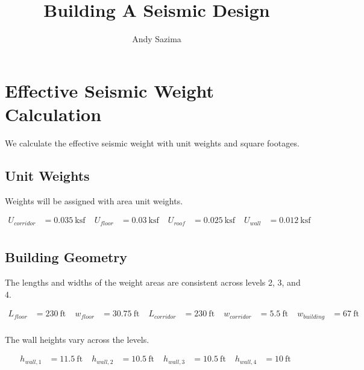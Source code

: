 \documentclass[11pt]{article}
\title{Building A Seismic Design}
\author{Andy Sazima}
\begin{document}
    
    \maketitle
    
    

    
    \section{Effective Seismic Weight
Calculation}\label{effective-seismic-weight-calculation}

    We calculate the effective seismic weight with unit weights and square
footages.

    \subsection{Unit Weights}\label{unit-weights}

    Weights will be assigned with area unit weights.

    \begin{equation*}
\begin{aligned}
U_{corridor} &= 0.035\ \mathrm{ksf} \; 
 &U_{floor} &= 0.03\ \mathrm{ksf} \; 
 &U_{roof} &= 0.025\ \mathrm{ksf} \; 
 &U_{wall} &= 0.012\ \mathrm{ksf} \; 
\\
\end{aligned}
\end{equation*}

    
    \subsection{Building Geometry}\label{building-geometry}

    The lengths and widths of the weight areas are consistent across levels
2, 3, and 4.

    \begin{equation*}
\begin{aligned}
L_{floor} &= 230\ \mathrm{ft} \; 
 &w_{floor} &= 30.75\ \mathrm{ft} \; 
 &L_{corridor} &= 230\ \mathrm{ft} \; 
 &w_{corridor} &= 5.5\ \mathrm{ft} \; 
 &w_{building} &= 67\ \mathrm{ft} \; 
\\
\end{aligned}
\end{equation*}

    
    The wall heights vary across the levels.

    \begin{equation*}
\begin{aligned}
h_{wall,1} &= 11.5\ \mathrm{ft} \; 
 &h_{wall,2} &= 10.5\ \mathrm{ft} \; 
 &h_{wall,3} &= 10.5\ \mathrm{ft} \; 
 &h_{wall,4} &= 10\ \mathrm{ft} \;
\end{aligned}
\end{equation*}
\end{document}
